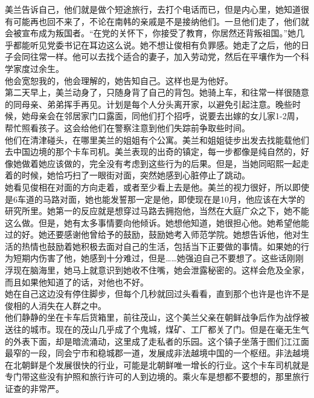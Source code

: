美兰告诉自己，他们就是做个短途旅行，去打个电话而已，但是内心里，她知道很有可能再也回不来了，不论在南韩的亲戚是不是接纳他们。一旦他们走了，他们就会被宣布成为叛国者。“在党的关怀下，你接受了教育，你居然还背叛祖国。”她几乎都能听见党委书记在耳边这么说。她不想让俊相有负罪感。她走了之后，他的日子会同往常一样。他可以去找个适合的妻子，加入劳动党，然后在平壤作为一个科学家度过余生。\\

他会宽恕我的，他会理解的，她告知自己。这样也是为他好。\\

第二天早上，美兰动身了，只随身背了自己的背包。她骑上车，和往常一样很随意的同母亲、弟弟挥手再见。计划是每个人分头离开家，以避免引起注意。晚些时候，她母亲会在邻居家门口露面，同他们打个招呼，说要去出嫁的女儿家1-2周，帮忙照看孩子。这会给他们在警察注意到他们失踪前争取些时间。\\

他们在清津碰头，在哪里美兰的姐姐有个公寓。美兰和姐姐徒步出发去找能载他们去中国边境的那个卡车司机。美兰表现的出奇的镇定，每一步都像是纯自然的，好像她做着她应该做的，完全没有考虑到这些行为的后果。但是，当她同昭熙一起走着的时候，她恰巧扫了一眼街对面，突然她感到心脏停止了跳动。\\

她看见俊相在对面的方向走着，或者至少看上去是他。美兰的视力很好，所以即使是6车道的马路对面，她也能发誓那一定是他，即使现在是10月，他应该在大学的研究所里。她第一的反应就是想穿过马路去拥抱他，当然在大庭广众之下，她不能这么做。但是，她有太多事情要向他倾诉。她想他知道，她很担心他。她希望他能过的好。她还要感谢他曾给予的鼓励，鼓励她考入师范学院。她想告诉他，他对生活的热情也鼓励着她积极去面对自己的生活，包括当下正要做的事情。如果她的行为短期内伤害了他，她感到十分难过，但是……她强迫自己不要想了。这些话刚刚浮现在脑海里，她马上就意识到她收不住嘴，她会泄露秘密的。这样会危及全家，而且如果他知道了的话，对他也不好。\\

她在自己这边没有停住脚步，但每个几秒就回过头看看，直到那个也许是也许不是俊相的人消失在人群之中。\\

他们静静的坐在卡车后货箱里，前往茂山，这个美兰父亲在朝鲜战争后作为战俘被送往的城市。现在的茂山几乎成了个鬼城，煤矿、工厂都关了门。但是在毫无生气的外表下面，却是暗流涌动，这里成了走私者的乐园。这个镇子坐落于图们江江面最窄的一段，同会宁市和稳城郡一道，发展成非法越境中国的一个枢纽。非法越境在北朝鲜是个发展很快的行业，可能是北朝鲜唯一增长的行业。这个卡车司机就是专门带这些没有护照和旅行许可的人到边境的。乘火车是想都不要想的，那里旅行证查的非常严。\\

